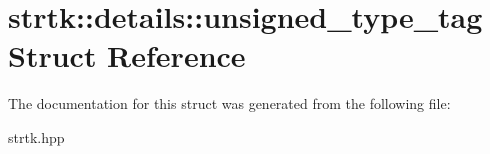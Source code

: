 \hypertarget{structstrtk_1_1details_1_1unsigned__type__tag}{\section{strtk\-:\-:details\-:\-:unsigned\-\_\-type\-\_\-tag Struct Reference}
\label{structstrtk_1_1details_1_1unsigned__type__tag}
}


The documentation for this struct was generated from the following file\-:\begin{DoxyCompactItemize}
\item 
strtk.\-hpp\end{DoxyCompactItemize}
